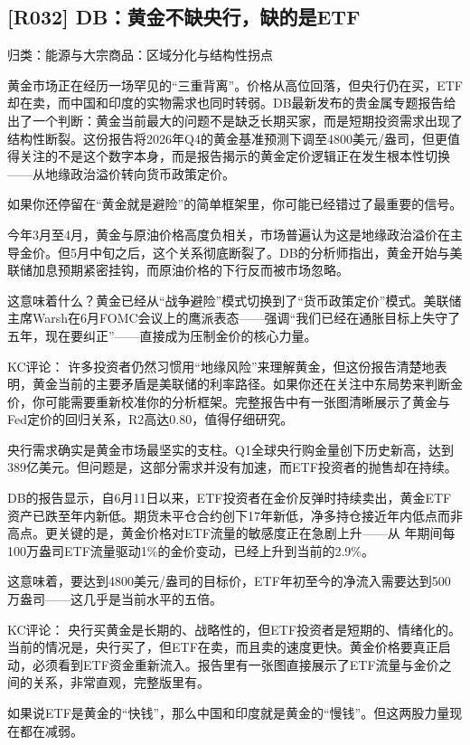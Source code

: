 \documentclass[11pt]{ctexart}
\begin{document}
\subsection{[R032] DB：黄金不缺央行，缺的是ETF}
{\small\color{refgray}归类：能源与大宗商品：区域分化与结构性拐点}

黄金市场正在经历一场罕见的“三重背离”。价格从高位回落，但央行仍在买，ETF却在卖，而中国和印度的实物需求也同时转弱。DB最新发布的贵金属专题报告给出了一个判断：黄金当前最大的问题不是缺乏长期买家，而是短期投资需求出现了结构性断裂。这份报告将2026年Q4的黄金基准预测下调至4800美元/盎司，但更值得关注的不是这个数字本身，而是报告揭示的黄金定价逻辑正在发生根本性切换——从地缘政治溢价转向货币政策定价。

如果你还停留在“黄金就是避险”的简单框架里，你可能已经错过了最重要的信号。

今年3月至4月，黄金与原油价格高度负相关，市场普遍认为这是地缘政治溢价在主导金价。但5月中旬之后，这个关系彻底断裂了。DB的分析师指出，黄金开始与美联储加息预期紧密挂钩，而原油价格的下行反而被市场忽略。

这意味着什么？黄金已经从“战争避险”模式切换到了“货币政策定价”模式。美联储主席Warsh在6月FOMC会议上的鹰派表态——强调“我们已经在通胀目标上失守了五年，现在要纠正”——直接成为压制金价的核心力量。

KC评论： 许多投资者仍然习惯用“地缘风险”来理解黄金，但这份报告清楚地表明，黄金当前的主要矛盾是美联储的利率路径。如果你还在关注中东局势来判断金价，你可能需要重新校准你的分析框架。完整报告中有一张图清晰展示了黄金与Fed定价的回归关系，R2高达0.80，值得仔细研究。

央行需求确实是黄金市场最坚实的支柱。Q1全球央行购金量创下历史新高，达到389亿美元。但问题是，这部分需求并没有加速，而ETF投资者的抛售却在持续。

DB的报告显示，自6月11日以来，ETF投资者在金价反弹时持续卖出，黄金ETF资产已跌至年内新低。期货未平仓合约创下17年新低，净多持仓接近年内低点而非高点。更关键的是，黄金价格对ETF流量的敏感度正在急剧上升——从 年期间每100万盎司ETF流量驱动1\%的金价变动，已经上升到当前的2.9\%。

这意味着，要达到4800美元/盎司的目标价，ETF年初至今的净流入需要达到500万盎司——这几乎是当前水平的五倍。

KC评论： 央行买黄金是长期的、战略性的，但ETF投资者是短期的、情绪化的。当前的情况是，央行买了，但ETF在卖，而且卖的速度更快。黄金价格要真正启动，必须看到ETF资金重新流入。报告里有一张图直接展示了ETF流量与金价之间的关系，非常直观，完整版里有。

如果说ETF是黄金的“快钱”，那么中国和印度就是黄金的“慢钱”。但这两股力量现在都在减弱。
\end{document}
